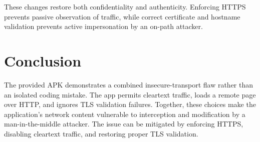 \documentclass[10pt,twocolumn,letterpaper]{article}
\begin{document}
These changes restore both confidentiality and authenticity. Enforcing HTTPS prevents passive observation of traffic, while correct certificate and hostname validation prevents active impersonation by an on-path attacker.

\section{Conclusion}
The provided APK demonstrates a combined insecure-transport flaw rather than an isolated coding mistake. The app permits cleartext traffic, loads a remote page over HTTP, and ignores TLS validation failures. Together, these choices make the application's network content vulnerable to interception and modification by a man-in-the-middle attacker. The issue can be mitigated by enforcing HTTPS, disabling cleartext traffic, and restoring proper TLS validation.
\end{document}
